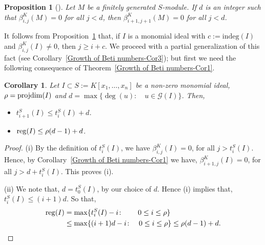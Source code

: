 \documentclass[a4paper,11pt]{amsart}
\theoremstyle{plain}
\newtheorem{cor}[thm]{Corollary}
\newtheorem{prop}[thm]{Proposition}
\theoremstyle{definition}
\theoremstyle{remark}
\begin{document}
\begin{prop}[{\cite[Prop. 1.9]{Eisenbud2}}] \label{simlar result with lower bound}
Let $M$ be a finitely generated $S$-module. If $d$ is an integer such that $\beta^K_{i,j} (M) = 0$ for all $j < d$, then $\beta_{i+1,j+1}^K (M) = 0$ for all $j < d$.
\end{prop}

It follows from Proposition~\ref{simlar result with lower bound} that, if $I$ is a monomial ideal with $c:= \mathrm{indeg}(I)$ and $\beta_{i,j}^K (I) \neq 0$, then $j \geq i+c$. We proceed with a partial generalization of this fact (see Corollary~\ref{Growth of Beti numbers-Cor3}); but first we need the following consequence of Theorem~\ref{Growth of Beti numbers-Cor1}.

\begin{cor} \label{Growth of Beti numbers-Cor2}
Let $I \subset S:=K[x_1, \ldots, x_n]$ be a non-zero monomial ideal, $\rho={\rm projdim}(I)$ and $d = \max \{ \deg (u) \colon \quad u \in \mathcal{G}(I) \}$. Then,
	\begin{itemize}
		\item[\rm (i)] $t_{i+1}^S(I) \leq t_i^S(I) +d$.
		\item[\rm (ii)] ${{\rm reg}}(I) \leq \rho(d-1)+d$.
	\end{itemize}
\end{cor}

\begin{proof}
(i) By the definition of $t_i^S(I)$, we have $\beta_{i,j}^K(I) = 0$, for all $j>t_i^S(I)$. Hence, by Corollary~\ref{Growth of Beti numbers-Cor1} we have, $\beta_{i+1,j}^K(I) = 0$, for all $j>d+t_i^S(I)$. This proves (i).
	
(ii) We note that, $d=t_0^S(I)$, by our choice of $d$. Hence (i) implies that, $t_i^S(I) \leq (i+1)d$. So that,
	\begin{align*}
	{{\rm reg}}(I)&= \max \{t_i^S(I)-i \colon \qquad 0 \leq i \leq \rho \} \\
	& \leq \max \{(i+1)d -i \colon \quad 0 \leq i \leq \rho \} \leq \rho(d-1)+d.
	\end{align*}
\end{proof}
\end{document}
